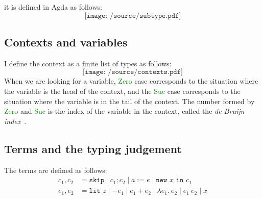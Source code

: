 \documentclass[12pt,a4paper]{report}
\theoremstyle{definition}
\newcommand{\gn}[1]{\textcolor{green}{#1}}
\newcommand{\gnt}[1]{\gn{\textsf{#1}}}
\begin{document}
        it is defined in Agda as follows:
        \[\texttt{[image: /source/subtype.pdf]}\]

        \subsection{Contexts and variables}
        I define the context as a finite list of types as follows:
        \[\texttt{[image: /source/contexts.pdf]}\]
        When we are looking for a variable, \gnt{Zero} case corresponds to the situation where the variable is the head of the context, and the \gnt{Suc} case corresponds to the situation where the variable is in the tail of the context. The number formed by \gnt{Zero} and \gnt{Suc} is the index of the variable in the context, called the \emph{de Bruijn index}~\autocite{de_bruijn}. 


        \subsection{Terms and the typing judgement} \label{subsec: terms}
        The terms are defined as follows:
        \[\begin{aligned}
            c_1, c_2 &= \texttt{skip} \mid c_1; c_2 \mid a := e \mid \texttt{new } x \texttt{ in } c_1 \\
            e_1, e_2 &= \texttt{lit } z \mid -e_1 \mid e_1 + e_2 \mid \lambda e_1.\ e_2 \mid e_1\ e_2 \mid x \\
        \end{aligned}\]
        
\end{document}
